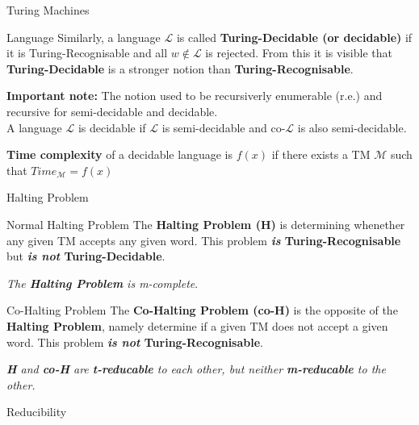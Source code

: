 \documentclass[12pt, letterpaper]{article}
\begin{document}
\begin{section}{Turing Machines}
\begin{subsection}{Language}
    Similarly, a language \(\mathscr{L}\) is called \textbf{Turing-Decidable (or decidable)}
    if it is Turing-Recognisable and all \(\textit{w} \notin \mathscr{L}\) is rejected.
    From this it is visible that \textbf{Turing-Decidable} is a stronger notion than
    \textbf{Turing-Recognisable}.

    \textbf{Important note:} The notion used to be recursiverly enumerable (r.e.)
    and recursive for semi-decidable and decidable. \\
    A language \(\mathscr{L}\) is decidable if \(\mathscr{L}\) is semi-decidable
    and co-\(\mathscr{L}\) is also semi-decidable.

    \textbf{Time complexity} of a decidable language is \(f(x)\) if there exists
    a TM \(\mathscr{M}\) such that \(Time_{\mathscr{M}} = f(x)\)
  \end{subsection}

  \begin{subsection}{Halting Problem}

    \begin{subsubsection}{Normal Halting Problem}
      The \textbf{Halting Problem (H)} is determining whenether any given TM
      accepts any given word. This problem \textbf{\emph{is} Turing-Recognisable}
      but \textbf{\emph{is not} Turing-Decidable}.

      \emph{The \textbf{Halting Problem} is m-complete}.
    \end{subsubsection}

    \begin{subsubsection}{Co-Halting Problem}
      The \textbf{Co-Halting Problem (co-H)} is the opposite of the \textbf{Halting Problem},
      namely determine if a given TM does not accept a given word. This problem
      \textbf{\emph{is not} Turing-Recognisable}.
    \end{subsubsection}

    \emph{\textbf{H} and \textbf{co-H} are \textbf{t-reducable} to each other, but
      neither \textbf{m-reducable} to the other.}

  \end{subsection}

  \begin{subsection}{Reducibility}


\end{subsection}
\end{section}
\end{document}
